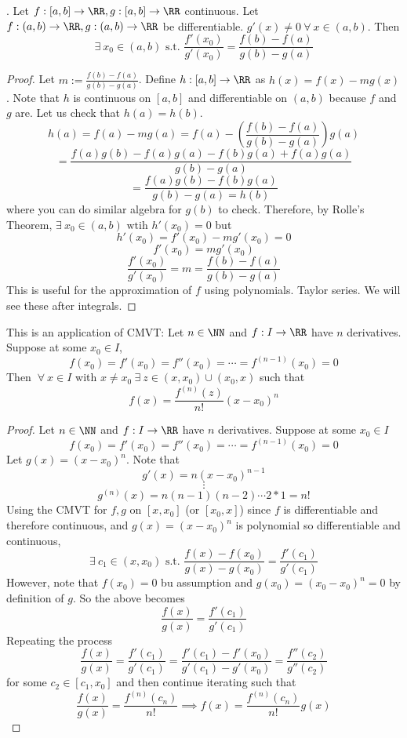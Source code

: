 \documentclass[12pt]{scrartcl}
\begin{document}
\begin{theorem}
  . Let $f: [a,b] \to \RR, g: [a,b] \to \RR$ continuous. 
  Let $f: (a,b) \to \RR, g: (a,b) \to \RR$ be differentiable.
  $g'(x) \neq 0 \ \forall \ x \in (a,b)$. Then 
  \[\exists \ x_0 \in (a,b) \text{ s.t. } \frac{f'(x_0)}{g'(x_0)} = \frac{f(b) - f(a)}{g(b) - g(a)}\]
  \begin{proof}
    Let $m := \frac{f(b) - f(a)}{g(b) - g(a)}$. Define $h: [a,b]\to \RR$ as 
    $h(x) = f(x) - mg(x)$. Note that $h$ is continuous on $[a,b]$ 
    and differentiable on $(a,b)$ because $f$ and $g$ are. Let us 
    check that $h(a) = h(b)$. 
    \[h(a) = f(a) - mg(a) = f(a) - (\frac{f(b) - f(a)}{g(b) - g(a)})g(a)\]
    \[= \frac{f(a)g(b) - f(a)g(a) - f(b)g(a) + f(a)g(a)}{g(b) - g(a)}\]
    \[= \frac{f(a)g(b) - f(b)g(a)}{g(b) - g(a) = h(b)}\]
    where you can do similar algebra for $g(b)$ to check.
    Therefore, by Rolle's Theorem, $\exists \ x_0 \in (a,b) \text{ wtih } h'(x_0) = 0$
    but
    \[h'(x_0) = f'(x_0) - mg'(x_0) = 0\]
    \[f'(x_0) = mg'(x_0)\]
    \[\frac{f'(x_0)}{g'(x_0)} = m = \frac{f(b) - f(a)}{g(b) - g(a)}\]
    This is useful for the approximation of $f$ using polynomials. Taylor series. 
    We will see these after integrals.
  \end{proof}
\end{theorem}

\begin{theorem}
  This is an application of CMVT: Let $n \in \NN$ and $f: I \to \RR$ have 
  $n$ derivatives. Suppose at some $x_0 \in I$, 
  \[f(x_0) = f'(x_0) = f''(x_0) = \cdots = f^{(n-1)}(x_0) = 0\]
  Then $\ \forall \ x \in I$ with $x \neq x_0 \ \exists \ z \in (x, x_0) \cup (x_0, x)$
  such that 
  \[f(x) = \frac{f^{(n)}(z)}{n!}(x-x_0)^n\]
  \begin{proof}
    Let $n \in \NN$ and $f: I \to \RR$ have $n$ derivatives.
    Suppose at some $x_0 \in I$
    \[f(x_0) = f'(x_0) = f''(x_0) = \cdots = f^{(n-1)}(x_0) = 0\]
    Let $g(x) = (x-x_0)^n$. Note that 
    \[g'(x) = n(x-x_0)^{n-1}\]
    \[\vdots\]
    \[g^{(n)}(x) = n(n-1)(n-2)\cdots 2 * 1 = n!\]
    Using the CMVT for $f, g$ on $[x, x_0]$ (or $[x_0, x]$)
    since $f$ is differentiable and therefore continuous, and 
    $g(x) = (x-x_0)^n$ is polynomial so differentiable and continuous, 
    \[\exists \ c_1 \in (x, x_0) \text{ s.t. } \frac{f(x) - f(x_0)}{g(x) - g(x_0)} = \frac{f'(c_1)}{g'(c_1)}\]
    However, note that $f(x_0) = 0$ bu assumption and $g(x_0) = (x_0 - x_0)^n = 0$
    by definition of $g$. So the above becomes 
    \[\frac{f(x)}{g(x)} = \frac{f'(c_1)}{g'(c_1)}\]
    Repeating the process
    \[\frac{f(x)}{g(x)} = \frac{f'(c_1)}{g'(c_1)} = \frac{f'(c_1) - f'(x_0)}{g'(c_1) - g'(x_0)} = \frac{f''(c_2)}{g''(c_2)}\]
    for some $c_2 \in [c_1, x_0]$ 
    and then continue iterating such that 
    \[\frac{f(x)}{g(x)} = \frac{f^{(n)}(c_n)}{n!} \implies f(x) = \frac{f^{(n)}(c_n)}{n!}g(x)\]
  \end{proof}
\end{theorem}
\end{document}
